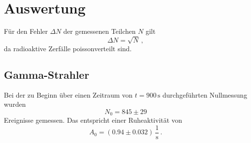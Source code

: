 \section{Auswertung}
\label{sec:Auswertung}
Für den Fehler $\Delta N$ der gemessenen Teilchen $N$ gilt
\begin{equation*}
    \Delta N = \sqrt{N} \,,
\end{equation*}
da radioaktive Zerfälle poissonverteilt sind.

\subsection{Gamma-Strahler}
\label{sec:Gamma-Strahler}



Bei der zu Beginn über einen Zeitraum von $t = 900 \,\unit{\second}$ durchgeführten Nullmessung wurden
\begin{equation*}
    N_0  = 845 \pm 29
\end{equation*}
Ereignisse gemessen.
Das entspricht einer Ruheaktivität von
\begin{equation*}
    A_0 = (0.94 \pm 0.032) \,\dfrac{1}{\unit{\second}} \, .
\end{equation*}

